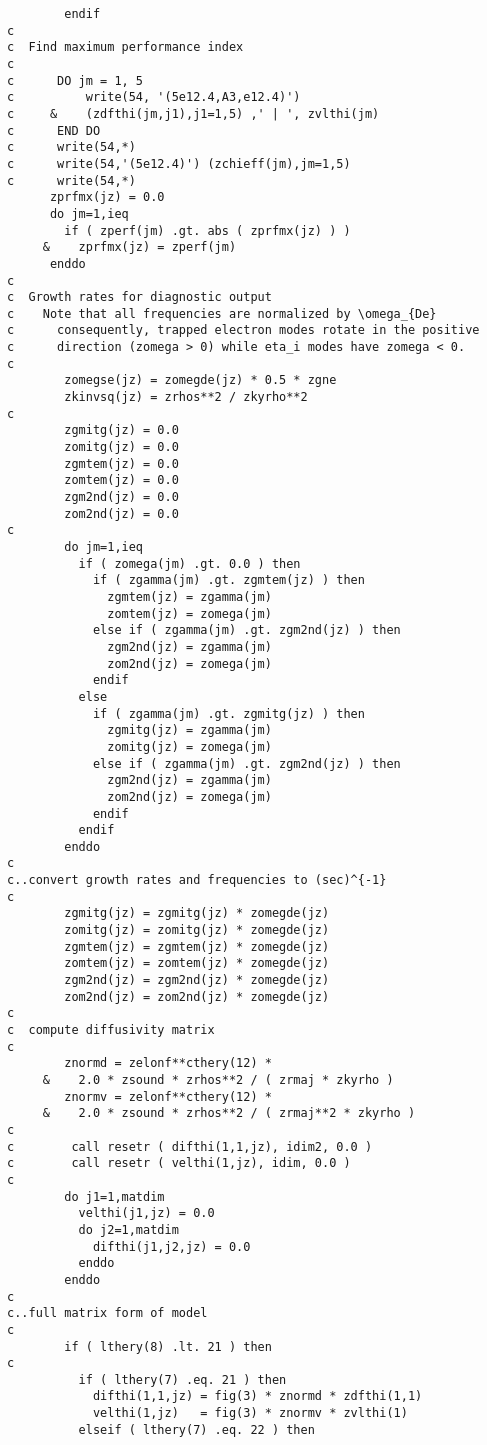\begin{verbatim}
        endif                   
c
c  Find maximum performance index
c
c      DO jm = 1, 5
c          write(54, '(5e12.4,A3,e12.4)') 
c     &    (zdfthi(jm,j1),j1=1,5) ,' | ', zvlthi(jm)
c      END DO
c      write(54,*)
c      write(54,'(5e12.4)') (zchieff(jm),jm=1,5)
c      write(54,*)
      zprfmx(jz) = 0.0
      do jm=1,ieq
        if ( zperf(jm) .gt. abs ( zprfmx(jz) ) )
     &    zprfmx(jz) = zperf(jm)
      enddo
c
c  Growth rates for diagnostic output
c    Note that all frequencies are normalized by \omega_{De}
c      consequently, trapped electron modes rotate in the positive
c      direction (zomega > 0) while eta_i modes have zomega < 0.
c
        zomegse(jz) = zomegde(jz) * 0.5 * zgne
        zkinvsq(jz) = zrhos**2 / zkyrho**2
c
        zgmitg(jz) = 0.0
        zomitg(jz) = 0.0
        zgmtem(jz) = 0.0
        zomtem(jz) = 0.0
        zgm2nd(jz) = 0.0
        zom2nd(jz) = 0.0
c
        do jm=1,ieq
          if ( zomega(jm) .gt. 0.0 ) then
            if ( zgamma(jm) .gt. zgmtem(jz) ) then
              zgmtem(jz) = zgamma(jm)
              zomtem(jz) = zomega(jm)
            else if ( zgamma(jm) .gt. zgm2nd(jz) ) then
              zgm2nd(jz) = zgamma(jm)
              zom2nd(jz) = zomega(jm)
            endif
          else
            if ( zgamma(jm) .gt. zgmitg(jz) ) then
              zgmitg(jz) = zgamma(jm)
              zomitg(jz) = zomega(jm)
            else if ( zgamma(jm) .gt. zgm2nd(jz) ) then
              zgm2nd(jz) = zgamma(jm)
              zom2nd(jz) = zomega(jm)
            endif
          endif
        enddo
c
c..convert growth rates and frequencies to (sec)^{-1}
c
        zgmitg(jz) = zgmitg(jz) * zomegde(jz)
        zomitg(jz) = zomitg(jz) * zomegde(jz)
        zgmtem(jz) = zgmtem(jz) * zomegde(jz)
        zomtem(jz) = zomtem(jz) * zomegde(jz)
        zgm2nd(jz) = zgm2nd(jz) * zomegde(jz)
        zom2nd(jz) = zom2nd(jz) * zomegde(jz)
c
c  compute diffusivity matrix
c
        znormd = zelonf**cthery(12) *
     &    2.0 * zsound * zrhos**2 / ( zrmaj * zkyrho )
        znormv = zelonf**cthery(12) *
     &    2.0 * zsound * zrhos**2 / ( zrmaj**2 * zkyrho )
c
c        call resetr ( difthi(1,1,jz), idim2, 0.0 )
c        call resetr ( velthi(1,jz), idim, 0.0 )
c
        do j1=1,matdim
          velthi(j1,jz) = 0.0
          do j2=1,matdim
            difthi(j1,j2,jz) = 0.0
          enddo
        enddo
c
c..full matrix form of model
c
        if ( lthery(8) .lt. 21 ) then
c
          if ( lthery(7) .eq. 21 ) then
            difthi(1,1,jz) = fig(3) * znormd * zdfthi(1,1)
            velthi(1,jz)   = fig(3) * znormv * zvlthi(1)
          elseif ( lthery(7) .eq. 22 ) then

\end{verbatim}
